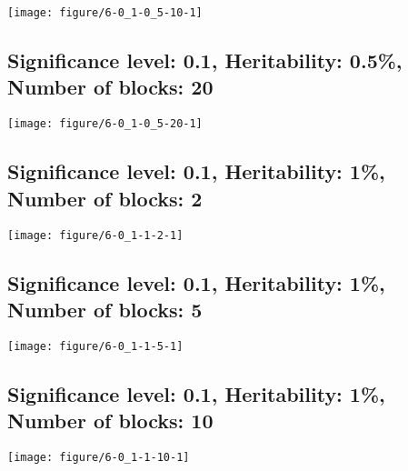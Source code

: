 \documentclass[11pt,letter]{article}\usepackage[]{graphicx}\usepackage[]{color}
\makeatletter
\def\maxwidth{ %
  \ifdim\Gin@nat@width>\linewidth
    \linewidth
  \else
    \Gin@nat@width
  \fi
}
\newenvironment{knitrout}{}{} %
\makeatother
\begin{document}
\begin{knitrout}
\color{fgcolor}
\texttt{[image: figure/6-0\_1-0\_5-10-1]} 

\end{knitrout}

\newpage
\subsection{Significance level: 0.1, Heritability: 0.5\%, Number of blocks: 20}

\begin{knitrout}
\color{fgcolor}
\texttt{[image: figure/6-0\_1-0\_5-20-1]} 

\end{knitrout}

\newpage
\subsection{Significance level: 0.1, Heritability: 1\%, Number of blocks: 2}

\begin{knitrout}
\color{fgcolor}
\texttt{[image: figure/6-0\_1-1-2-1]} 

\end{knitrout}

\newpage
\subsection{Significance level: 0.1, Heritability: 1\%, Number of blocks: 5}

\begin{knitrout}
\color{fgcolor}
\texttt{[image: figure/6-0\_1-1-5-1]} 

\end{knitrout}

\newpage
\subsection{Significance level: 0.1, Heritability: 1\%, Number of blocks: 10}

\begin{knitrout}
\color{fgcolor}
\texttt{[image: figure/6-0\_1-1-10-1]} 

\end{knitrout}
\end{document}

